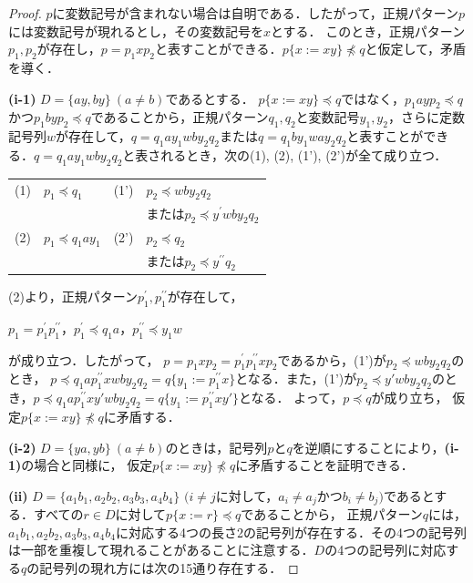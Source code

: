 \begin{proof}
\noindent $p$に変数記号が含まれない場合は自明である．したがって，正規パターン$p$には変数記号が現れるとし，その変数記号を$x$とする．
このとき，正規パターン$p_{1},p_{2}$が存在し，$p=p_{1}xp_{2}$と表すことができる．$p \{ x := xy \} \not \preceq q$と仮定して，矛盾を導く．
\smallskip

\noindent
\textbf{(i-1)} $D=\{ ay, by \} \ (a \ne b)$であるとする．
$p \{ x := xy \} \preceq q$ではなく，$p_{1}ayp_{2}\preceq q$かつ$p_{1}byp_{2}\preceq q$であることから，正規パターン$q_{1},q_{2}$と変数記号$y_{1},y_{2}$，さらに定数記号列$w$が存在して，$q=q_{1}ay_{1}wby_{2}q_{2}$または$q=q_{1}by_{1}way_{2}q_{2}$と表すことができる．$q=q_{1}ay_{1}wby_{2}q_{2}$と表されるとき，次の(1), (2), (1'), (2')が全て成り立つ．
\smallskip

\begin{tabular}{llll}
(1) & $p_{1} \preceq q_{1}$ & (1') & $p_{2} \preceq wby_{2}q_{2}$\\
&&&または$p_{2} \preceq y^{\prime}wby_{2}q_{2}$ \\
(2) & $p_{1} \preceq q_{1}ay_{1}$ & (2') & $p_{2} \preceq q_{2}$\\
&&&または$p_{2} \preceq y^{\prime\prime}q_{2}$
\end{tabular}
\smallskip

(2)より，正規パターン$p_{1}^{\prime},p_{1}^{\prime\prime}$が存在して，
\begin{center}
$p_{1}=p_{1}^{\prime}p_{1}^{\prime\prime}$，$p_{1}^{\prime} \preceq q_{1}a$，$p_{1}^{\prime\prime} \preceq y_{1}w$
\end{center}
が成り立つ．したがって，
$p=p_{1}xp_{2}=p_{1}^{\prime}p_{1}^{\prime\prime}xp_{2}$であるから，(1')が$p_{2} \preceq wby_{2}q_{2}$のとき，
$p\preceq q_{1}ap_{1}^{\prime\prime}xwby_{2}q_{2}=q \{ y_{1} := p_{1}^{\prime\prime}x \}$となる．また，(1')が$p_2\preceq y'wby_{2}q_{2}$のとき，$p\preceq q_{1}ap_{1}^{\prime\prime}xy'wby_{2}q_{2}=q \{ y_{1} := p_{1}^{\prime\prime}xy' \}$となる．
よって，$p \preceq q$が成り立ち，
仮定$p \{ x := xy \} \not\preceq q$に矛盾する．
\smallskip

\noindent
\textbf{(i-2)} $D=\{ ya, yb \} \ (a \ne b)$のときは，記号列$p$と$q$を逆順にすることにより，\textbf{(i-1)}の場合と同様に， 仮定$p \{ x := xy \} \not\preceq q$に矛盾することを証明できる．
\smallskip

\noindent 
\textbf{(ii)} $D=\{ a_{1}b_{1}, a_{2}b_{2}, a_{3}b_{3}, a_{4}b_{4} \}$ $(i \ne j$に対して，$a_{i} \ne a_{j}$かつ$b_{i} \ne b_{j})$であるとする．すべての$r \in D$に対して$p \{ x := r \} \preceq q$であることから，
正規パターン$q$には，$a_{1}b_{1}, a_{2}b_{2}, a_{3}b_{3}, a_{4}b_{4}$に対応する4つの長さ2の記号列が存在する．その4つの記号列は一部を重複して現れることがあることに注意する．$D$の4つの記号列に対応する$q$の記号列の現れ方には次の15通り存在する．


\end{proof}
